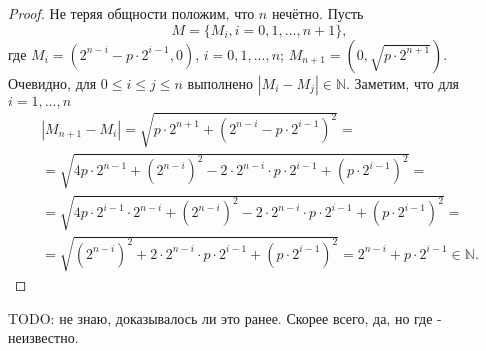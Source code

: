 \begin{proof}
	Не теряя общности положим, что $n$ нечётно.
	Пусть
	\begin{equation*}
		M = \{M_i, i =0,1,...,n+1\},
	\end{equation*}
	где
	$M_i = (2^{n-i}-p\cdot 2^{i-1},0)$, $i=0,1,...,n$;
	$M_{n+1} = (0,\sqrt{p \cdot 2^{n+1}})$.
	Очевидно, для $0\leqslant i \leqslant j \leqslant n$ выполнено
	$|M_i- M_j|\in\mathbb{N}$.
	Заметим, что для $i=1,...,n$
	\begin{multline*}
		|M_{n+1} - M_i| =
		\sqrt{p\cdot 2^{n+1} + (2^{n-i}-p\cdot2^{i-1})^2}
		=
		\\=
		\sqrt{4p\cdot 2^{n-1} + (2^{n-i})^2 - 2 \cdot 2^{n-i} \cdot p \cdot 2^{i-1} + (p\cdot 2^{i-1})^2}
		=
		\\=
		\sqrt{4p\cdot 2^{i-1} \cdot 2^{n-i} + (2^{n-i})^2 - 2 \cdot 2^{n-i} \cdot p \cdot 2^{i-1} + (p\cdot 2^{i-1})^2}
		=
		\\=
		\sqrt{(2^{n-i})^2 + 2 \cdot 2^{n-i} \cdot p \cdot 2^{i-1} + (p\cdot 2^{i-1})^2}
		=
		2^{n-i} + p\cdot 2^{i-1}
		\in\mathbb{N}
		.
	\end{multline*}
\end{proof}

TODO: не знаю, доказывалось ли это ранее. Скорее всего, да, но где - неизвестно.




